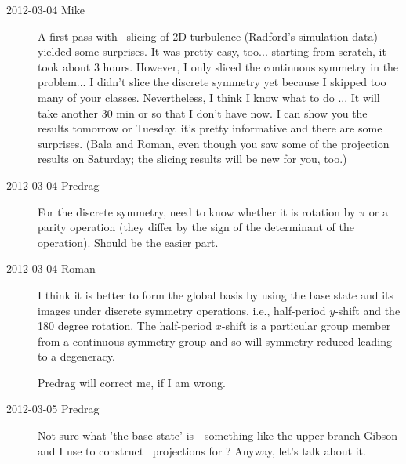 \begin{description}
\item[2012-03-04 Mike]
A first pass with \statesp\ slicing of 2D turbulence (Radford's
simulation data) yielded some surprises.  It was pretty easy, too...
starting from scratch, it took about 3 hours. However, I only sliced the
continuous symmetry in the problem... I didn't slice the discrete
symmetry yet because I skipped too many of your classes. Nevertheless, I
think I know what to do ... It will take another 30 min or so that I
don't have now.  I can show you the results tomorrow or Tuesday. it's
pretty informative and there are some surprises.  (Bala and Roman, even
though you saw some of the projection results on Saturday; the slicing
results will be new for you, too.)

\item[2012-03-04 Predrag] For the discrete symmetry, need to know whether it is
rotation by $\pi$ or a parity operation (they differ by the sign of the
determinant of the operation). Should be the easier part.

\item[2012-03-04 Roman] I think it is better to form the global basis by
using the base state and its images under discrete symmetry operations,
i.e., half-period $y$-shift and the 180 degree rotation. The half-period
$x$-shift is a particular group member from a continuous symmetry group and
so will symmetry-reduced leading to a degeneracy.

Predrag will correct me, if I am wrong.

\item[2012-03-05 Predrag] Not sure what 'the base state' is - something like
the upper branch Gibson and I use to construct \statesp\ projections for \pCf?
Anyway, let's talk about it.


\end{description}

